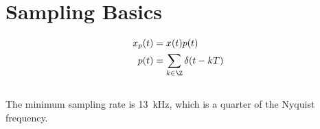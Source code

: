 \documentclass{article}
\begin{document}
\section{Sampling Basics}

\begin{align}
    x_p(t) &= x(t) p(t) \\
    p(t) &= \sum_{k \in \Z} \delta(t - kT)
\end{align}

\subsection{}

The minimum sampling rate is \SI{13}{\kilo\hertz}, which is a quarter of the Nyquist frequency.

\subsection{}
\end{document}
